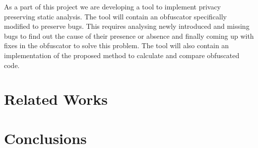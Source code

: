 As a part of this project we are developing a tool to implement privacy preserving static analysis. The tool will contain an obfuscator specifically modified to preserve bugs. This 
requires analysing newly introduced and missing bugs to find out the cause of their presence or absence and finally coming up with fixes in the obfuscator to solve this problem. The 
tool will also contain an implementation of the proposed method to calculate and compare obfuscated code.
\section{Related Works}
\section{Conclusions}





